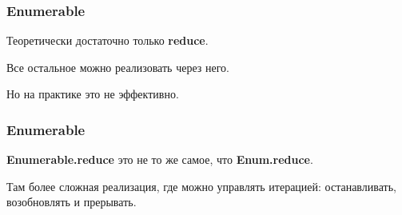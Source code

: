 \documentclass[10pt]{beamer}
\begin{document}
\begin{frame}
  \frametitle{Enumerable}
  Теоретически достаточно только \textbf{reduce}.
  \par \bigskip
  Все остальное можно реализовать через него.
  \par \bigskip
  Но на практике это не эффективно.
\end{frame}

\begin{frame}
  \frametitle{Enumerable}
  \textbf{Enumerable.reduce} это не то же самое, что \textbf{Enum.reduce}.
  \par \bigskip
  Там более сложная реализация, где можно управлять итерацией:
  останавливать, возобновлять и прерывать.
\end{frame}
\end{document}
